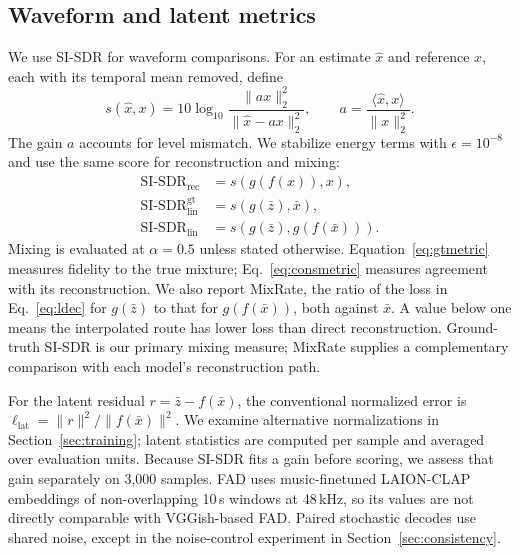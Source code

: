 \documentclass[conference]{IEEEtran}
\newcommand{\secref}[1]{Section~\ref{#1}}
\begin{document}
\subsection{Waveform and latent metrics}\label{sec:metrics}
We use SI-SDR \cite{leroux2019sdr} for waveform comparisons. For an estimate
$\hat{x}$ and reference $x$, each with its temporal mean removed, define
\begin{equation}
  s(\hat{x},x)=10\log_{10}
  \frac{\lVert a x\rVert_2^2}{\lVert\hat{x}-a x\rVert_2^2},
  \qquad a=\frac{\langle\hat{x},x\rangle}{\lVert x\rVert_2^2}.
  \label{eq:sisdr}
\end{equation}
The gain $a$ accounts for level mismatch. We stabilize energy terms with
$\epsilon=10^{-8}$ and use the same score for reconstruction and mixing:
\begin{align}
  \mathrm{SI\text{-}SDR}_\mathrm{rec}
    &=s(g(f(x)),x), \label{eq:recmetric}\\
  \mathrm{SI\text{-}SDR}_\mathrm{lin}^\mathrm{gt}
    &=s(g(\bar{z}),\bar{x}), \label{eq:gtmetric}\\
  \mathrm{SI\text{-}SDR}_\mathrm{lin}
    &=s(g(\bar{z}),g(f(\bar{x}))). \label{eq:consmetric}
\end{align}
Mixing is evaluated at $\alpha=0.5$ unless stated otherwise.
Equation~\ref{eq:gtmetric} measures fidelity to the true mixture;
Eq.~\ref{eq:consmetric} measures agreement with its reconstruction. We also report
MixRate, the ratio of the loss in Eq.~\ref{eq:ldec} for $g(\bar{z})$ to that
for $g(f(\bar{x}))$, both against $\bar{x}$. A value below one means the
interpolated route has lower loss than direct reconstruction. Ground-truth
SI-SDR is our primary mixing measure; MixRate supplies a complementary
comparison with each model's reconstruction path.

For the latent residual $r=\bar{z}-f(\bar{x})$, the conventional normalized
error is $\ell_\mathrm{lat}=\lVert r\rVert^2/\lVert f(\bar{x})\rVert^2$.
We examine alternative normalizations in \secref{sec:training}; latent
statistics are computed per sample and averaged over evaluation units.
Because SI-SDR fits a gain before scoring, we assess that gain separately on
3{,}000 samples. FAD uses music-finetuned LAION-CLAP embeddings of
non-overlapping 10\,s windows at 48\,kHz, so its values are not directly
comparable with VGGish-based FAD. Paired stochastic decodes use shared noise,
except in the noise-control experiment in \secref{sec:consistency}.
\end{document}
